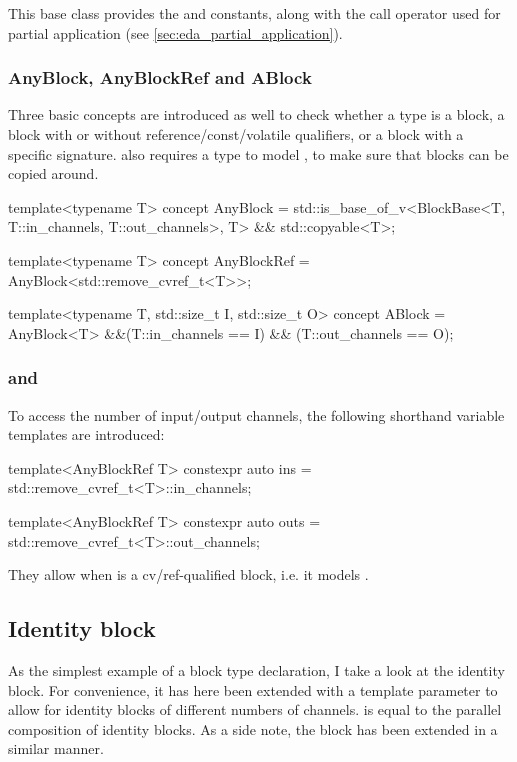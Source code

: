 This base class provides the  and  constants, along with the call operator used
for partial application (see \autoref{sec:eda_partial_application}).

\subsubsection{AnyBlock, AnyBlockRef and ABlock}

Three basic concepts are introduced as well to check whether a type  is a block, a
block with or without reference/const/volatile qualifiers, or a block with a specific signature.
 also requires a type to model \footnotemark, to make sure that
blocks can be copied around.


\begin{cppcodenl}
  template<typename T>
  concept AnyBlock = std::is_base_of_v<BlockBase<T, T::in_channels, T::out_channels>, T> && std::copyable<T>;

  template<typename T>
  concept AnyBlockRef = AnyBlock<std::remove_cvref_t<T>>;

  template<typename T, std::size_t I, std::size_t O>
  concept ABlock = AnyBlock<T> &&(T::in_channels == I) && (T::out_channels == O);
\end{cppcodenl}

\subsubsection{ and }

To access the number of input/output channels, the following shorthand variable templates are introduced:

\begin{cppcodenl}
  template<AnyBlockRef T>
  constexpr auto ins = std::remove_cvref_t<T>::in_channels;

  template<AnyBlockRef T>
  constexpr auto outs = std::remove_cvref_t<T>::out_channels;
\end{cppcodenl}

They allow  when  is a cv/ref-qualified block, i.e. it models .

\subsection{Identity block}
As the simplest example of a block type declaration, I take a look at the identity block. For convenience, it
has here been extended with a template parameter  to allow for identity blocks of
different numbers of channels.
 is equal to the parallel composition of  identity blocks. As a side note, the \Cut block has been
extended in a similar manner.

